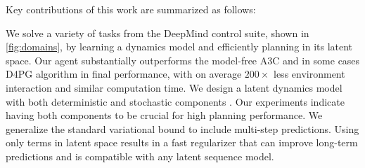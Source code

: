Key contributions of this work are summarized as follows:
\begin{itemize}
We solve a variety of tasks from the DeepMind control suite, shown in \cref{fig:domains}, by learning a dynamics model and efficiently planning in its latent space. Our agent substantially outperforms the model-free A3C and in some cases D4PG algorithm in final performance, with on average $200\times$ less environment interaction and similar computation time.
 We design a latent dynamics model with both deterministic and stochastic components \citep{buesing2018dssm,chung2015vrnn}. Our experiments indicate having both components to be crucial for high planning performance.
We generalize the standard variational bound to include multi-step predictions. Using only terms in latent space results in a fast regularizer that can improve long-term predictions and is compatible with any latent sequence model.
\end{itemize}
